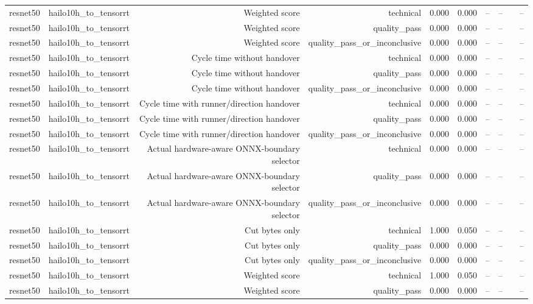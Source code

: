 \begin{table}[t]
\begin{tabular}{lrrrrrrrrr}
resnet50 & hailo10h\_to\_tensorrt & Weighted score & technical & 0.000 & 0.000 & -- & -- &  & -- \\
resnet50 & hailo10h\_to\_tensorrt & Weighted score & quality\_pass & 0.000 & 0.000 & -- & -- &  & -- \\
resnet50 & hailo10h\_to\_tensorrt & Weighted score & quality\_pass\_or\_inconclusive & 0.000 & 0.000 & -- & -- &  & -- \\
resnet50 & hailo10h\_to\_tensorrt & Cycle time without handover & technical & 0.000 & 0.000 & -- & -- &  & -- \\
resnet50 & hailo10h\_to\_tensorrt & Cycle time without handover & quality\_pass & 0.000 & 0.000 & -- & -- &  & -- \\
resnet50 & hailo10h\_to\_tensorrt & Cycle time without handover & quality\_pass\_or\_inconclusive & 0.000 & 0.000 & -- & -- &  & -- \\
resnet50 & hailo10h\_to\_tensorrt & Cycle time with runner/direction handover & technical & 0.000 & 0.000 & -- & -- &  & -- \\
resnet50 & hailo10h\_to\_tensorrt & Cycle time with runner/direction handover & quality\_pass & 0.000 & 0.000 & -- & -- &  & -- \\
resnet50 & hailo10h\_to\_tensorrt & Cycle time with runner/direction handover & quality\_pass\_or\_inconclusive & 0.000 & 0.000 & -- & -- &  & -- \\
resnet50 & hailo10h\_to\_tensorrt & Actual hardware-aware ONNX-boundary selector & technical & 0.000 & 0.000 & -- & -- &  & -- \\
resnet50 & hailo10h\_to\_tensorrt & Actual hardware-aware ONNX-boundary selector & quality\_pass & 0.000 & 0.000 & -- & -- &  & -- \\
resnet50 & hailo10h\_to\_tensorrt & Actual hardware-aware ONNX-boundary selector & quality\_pass\_or\_inconclusive & 0.000 & 0.000 & -- & -- &  & -- \\
resnet50 & hailo10h\_to\_tensorrt & Cut bytes only & technical & 1.000 & 0.050 & -- & -- &  & -- \\
resnet50 & hailo10h\_to\_tensorrt & Cut bytes only & quality\_pass & 0.000 & 0.000 & -- & -- &  & -- \\
resnet50 & hailo10h\_to\_tensorrt & Cut bytes only & quality\_pass\_or\_inconclusive & 0.000 & 0.000 & -- & -- &  & -- \\
resnet50 & hailo10h\_to\_tensorrt & Weighted score & technical & 1.000 & 0.050 & -- & -- &  & -- \\
resnet50 & hailo10h\_to\_tensorrt & Weighted score & quality\_pass & 0.000 & 0.000 & -- & -- &  & -- \\

\end{tabular}
\end{table}
